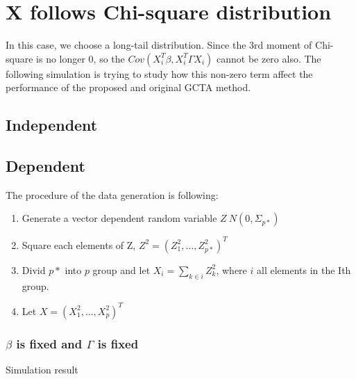 \documentclass[]{article}
\providecommand{\tightlist}{%
  \setlength{\itemsep}{0pt}\setlength{\parskip}{0pt}}
\begin{document}
\section{X follows Chi-square
distribution}\label{x-follows-chi-square-distribution}

In this case, we choose a long-tail distribution. Since the 3rd moment
of Chi-square is no longer 0, so the
\(Cov(X_i^T\beta, X_i^T\Gamma X_i)\) cannot be zero also. The following
simulation is trying to study how this non-zero term affect the
performance of the proposed and original GCTA method.

\subsection{Independent}\label{independent-1}

\subsection{Dependent}\label{dependent}

The procedure of the data generation is following:

\begin{enumerate}
\def\labelenumi{\arabic{enumi}.}
\tightlist
\item
  Generate a vector dependent random variable \(Z ~ N(0, \Sigma_{p*})\)
\item
  Square each elements of Z, \(Z^2 = (Z_1^2, \dots, Z_{p*}^2)^T\)
\item
  Divid \(p*\) into \(p\) group and let \(X_i = \sum_{k\in i} Z_{k}^2\),
  where \(i\) all elements in the Ith group.
\item
  Let \(X = (X_1^2, \dots, X_{p}^2)^T\)
\end{enumerate}

\subsubsection{\texorpdfstring{\(\beta\) is fixed and \(\Gamma\) is
fixed}{\textbackslash{}beta is fixed and \textbackslash{}Gamma is fixed}}\label{beta-is-fixed-and-gamma-is-fixed-1}

Simulation result
\end{document}
